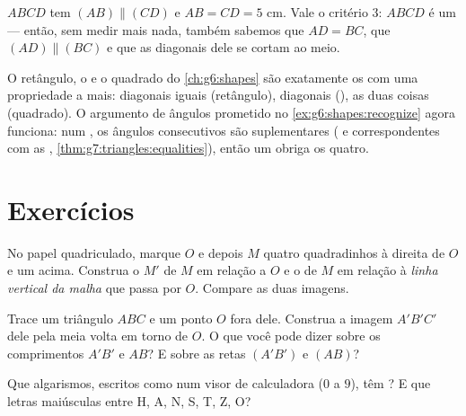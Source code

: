 \begin{example}\label{ex:g7:central:recognize}
$ABCD$ tem $(AB) \parallel (CD)$ e $AB = CD = 5$ cm. Vale o critério
3: $ABCD$ é um  --- então, sem medir mais nada, também
sabemos que $AD = BC$, que $(AD) \parallel (BC)$ e que as diagonais
dele se cortam ao meio.
\end{example}

\begin{remark}
O retângulo, o  e o quadrado do \cref{ch:g6:shapes} são
exatamente os  com uma propriedade a mais: diagonais
iguais (retângulo), diagonais  (), as duas coisas
(quadrado). O argumento de ângulos prometido no
\cref{ex:g6:shapes:recognize} agora funciona: num , os
ângulos consecutivos são suplementares ( e
correspondentes com as ,
\cref{thm:g7:triangles:equalities}), então um  obriga os
quatro.
\end{remark}

\section{Exercícios}

\begin{exercise}[$\star$]\label{exo:g7:central:1}
No papel quadriculado, marque $O$ e depois $M$ quatro quadradinhos à
direita de $O$ e um acima. Construa o  $M'$ de $M$ em relação
a $O$ e o  de $M$ em relação à \emph{linha vertical da malha}
que passa por $O$. Compare as duas imagens.
\end{exercise}

\begin{exercise}[$\star$]\label{exo:g7:central:2}
Trace um triângulo $ABC$ e um ponto $O$ fora dele. Construa a imagem
$A'B'C'$ dele pela meia volta em torno de $O$. O que você pode dizer
sobre os comprimentos $A'B'$ e $AB$? E sobre as retas $(A'B')$ e
$(AB)$?
\end{exercise}

\begin{exercise}[$\star$]\label{exo:g7:central:3}
Que algarismos, escritos como num visor de calculadora ($0$ a $9$), têm
? E que letras maiúsculas entre H, A, N, S, T, Z, O?
\end{exercise}

